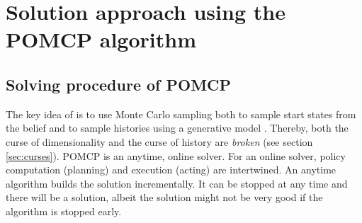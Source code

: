 \section{Solution approach using the POMCP algorithm}

\subsection{Solving procedure of POMCP}
\label{sec:pomcp}


The key idea of  is to use Monte Carlo sampling both to sample start states from the belief and to sample histories using a generative model \parencite{pomcp}. Thereby, both the curse of dimensionality and the curse of history are \emph{broken} (see section \ref{sec:curses}). POMCP is an anytime, online solver. For an online solver, policy computation (planning) and execution (acting) are intertwined. An anytime algorithm builds the solution incrementally. It can be stopped at any time and there will be a solution, albeit the solution might not be very good if the algorithm is stopped early.




